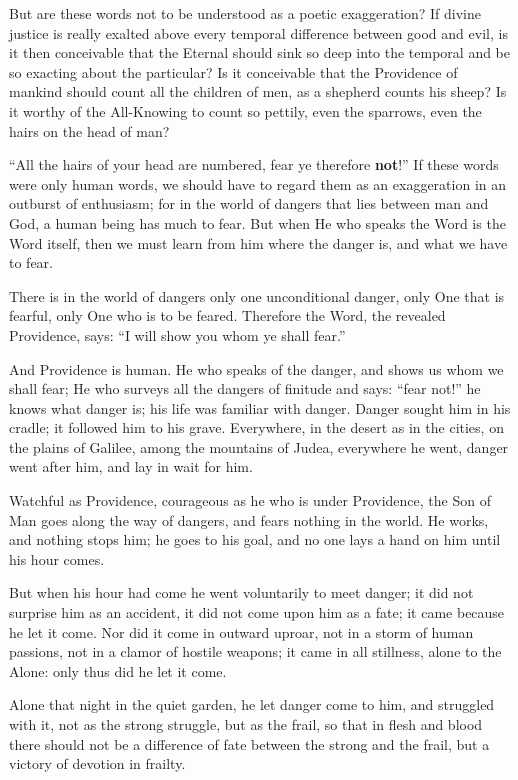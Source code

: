 \documentclass[12pt,a4paper,openany]{book}
\newcommand{\opage}[1]{\marginnote{\footnotesize\textit{[#1]}}}
\begin{document}
But are these words not to be understood as
a poetic exaggeration? If divine
justice is really exalted above
every temporal difference between good and evil,
is it then conceivable that the Eternal should sink
so deep into the temporal and be so exacting
about the particular? Is it conceivable that
the Providence of mankind should count all the
children of men, as a shepherd counts his sheep?
Is it worthy of the All-Knowing to count so pettily,
even the sparrows, even the hairs on the
head of man?

``All the hairs of your head are numbered, fear ye
therefore \textbf{not}!'' If these words were only human
words, we should have to regard them
as an exaggeration in an outburst of enthusiasm;
for in the world of dangers that lies
between man and God, a human being
has much to fear. But when He who
speaks the Word is the Word itself, then we must learn
from him where the danger is, and what we have to
fear.

\setcounter{footnote}{0}%
\opage{31}There is in the world of dangers only one unconditional
danger, only One that is fearful, only One
who is to be feared. Therefore the Word, the
revealed Providence, says: ``I will show you whom
ye shall fear.''

And Providence is human. He who
speaks of the danger, and shows us whom we shall
fear; He who surveys all the dangers of
finitude and says: ``fear not!'' he knows what
danger is; his life was familiar with danger.
Danger sought him in his cradle; it followed
him to his grave. Everywhere, in the desert as
in the cities, on the plains of Galilee, among
the mountains of Judea, everywhere he went, danger
went after him, and lay in wait for him.

Watchful as Providence, courageous as he
who is under Providence, the Son of Man goes
along the way of dangers, and fears nothing in the world.
He works, and nothing stops him;
he goes to his goal, and no one lays a hand
on him until his hour comes.

But when his hour had come he went
voluntarily to meet danger; it did not surprise him
as an accident, it did not come upon him as
a fate; it came because he let it come.
\setcounter{footnote}{0}%
\opage{32}Nor did it come in outward uproar, not in
a storm of human passions, not in a
clamor of hostile weapons; it came in all
stillness, alone to the Alone: only thus
did he let it come.

Alone that night in the quiet garden, he let
danger come to him, and struggled with it, not
as the strong struggle, but as the frail, so that in flesh and blood there should not be
a difference of fate between the strong and the
frail, but a victory of devotion in
frailty.
\end{document}
